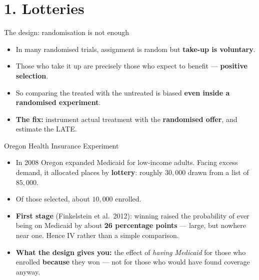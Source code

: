 \documentclass[
  11pt,
  ignorenonframetext,
  aspectratio=169,
]{beamer}
\providecommand{\tightlist}{%
  \setlength{\itemsep}{0pt}\setlength{\parskip}{0pt}}
\begin{document}
\section{1. Lotteries}\label{lotteries}

\begin{frame}{The design: randomisation is not enough}
\protect{}\label{the-design-randomisation-is-not-enough}
\begin{itemize}
\tightlist
\item
  In many randomised trials, assignment is random but \textbf{take-up is
  voluntary}.
\item
  Those who take it up are precisely those who expect to benefit ---
  \textbf{positive selection}.
\item
  So comparing the treated with the untreated is biased \textbf{even
  inside a randomised experiment}.
\end{itemize}

\vspace{0.4em}

\begin{itemize}
\tightlist
\item
  \textbf{The fix:} instrument actual treatment with the
  \textbf{randomised offer}, and estimate the LATE.
\end{itemize}
\end{frame}

\begin{frame}{Oregon Health Insurance Experiment}
\protect{}\label{oregon-health-insurance-experiment}
\begin{itemize}
\tightlist
\item
  In 2008 Oregon expanded Medicaid for low-income adults. Facing excess
  demand, it allocated places by \textbf{lottery}: roughly \(30{,}000\)
  drawn from a list of \(85{,}000\).
\item
  Of those selected, about \(10{,}000\) enrolled.
\item
  \textbf{First stage} (Finkelstein et al.~2012): winning raised the
  probability of ever being on Medicaid by about \textbf{26 percentage
  points} --- large, but nowhere near one. Hence IV rather than a simple
  comparison.
\item
  \textbf{What the design gives you:} the effect of \emph{having
  Medicaid} for those who enrolled \textbf{because} they won --- not for
  those who would have found coverage anyway.
\end{itemize}
\end{frame}
\end{document}
